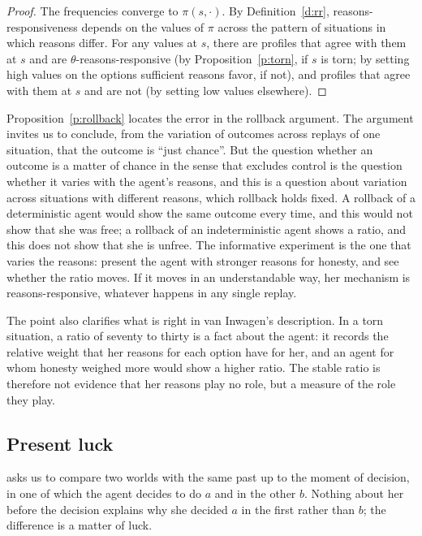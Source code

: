 \documentclass{situationist-preprint}
\begin{document}
\begin{proof}
The frequencies converge to $\pi(s,\cdot)$. By Definition~\ref{d:rr}, reasons-responsiveness depends on the values of $\pi$ across the pattern of situations in which reasons differ. For any values at $s$, there are profiles that agree with them at $s$ and are $\theta$-reasons-responsive (by Proposition~\ref{p:torn}, if $s$ is torn; by setting high values on the options sufficient reasons favor, if not), and profiles that agree with them at $s$ and are not (by setting low values elsewhere).
\end{proof}

Proposition~\ref{p:rollback} locates the error in the rollback argument. The argument invites us to conclude, from the variation of outcomes across replays of one situation, that the outcome is \enquote{just chance}. But the question whether an outcome is a matter of chance in the sense that excludes control is the question whether it varies with the agent's reasons, and this is a question about variation across situations with different reasons, which rollback holds fixed. A rollback of a deterministic agent would show the same outcome every time, and this would not show that she was free; a rollback of an indeterministic agent shows a ratio, and this does not show that she is unfree. The informative experiment is the one that varies the reasons: present the agent with stronger reasons for honesty, and see whether the ratio moves. If it moves in an understandable way, her mechanism is reasons-responsive, whatever happens in any single replay.

The point also clarifies what is right in van Inwagen's description. In a torn situation, a ratio of seventy to thirty is a fact about the agent: it records the relative weight that her reasons for each option have for her, and an agent for whom honesty weighed more would show a higher ratio. The stable ratio is therefore not evidence that her reasons play no role, but a measure of the role they play.

\subsection{Present luck}

\citet{Mele2006} asks us to compare two worlds with the same past up to the moment of decision, in one of which the agent decides to do $a$ and in the other $b$. Nothing about her before the decision explains why she decided $a$ in the first rather than $b$; the difference is a matter of luck.
\end{document}
